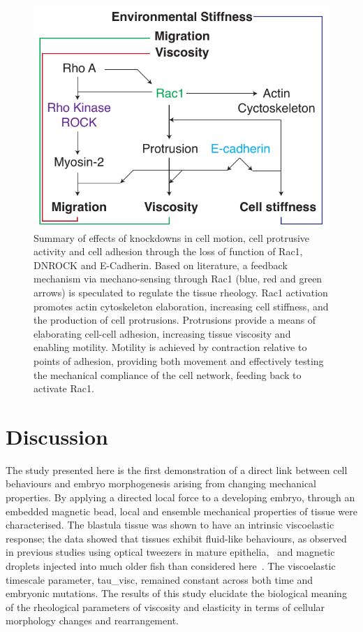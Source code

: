 \begin{figure}
 \centering
 \includegraphics{Chapters/tweezers/Figs/PDF/interconnected_protein_signalling}
 \caption{Summary of effects of knockdowns in cell motion, cell protrusive activity and cell adhesion through the loss of function of \gls{Rac1}, \gls{DNROCK} and E-Cadherin.
 Based on literature, a feedback mechanism via mechano-sensing through \gls{Rac1} (blue, red and green arrows) is speculated to regulate the tissue rheology.
 \gls{Rac1} activation promotes actin cytoskeleton elaboration, increasing cell stiffness, and the production of cell protrusions.
 Protrusions provide a means of elaborating cell-cell adhesion, increasing tissue viscosity and enabling motility.
 Motility is achieved by contraction relative to points of adhesion, providing both movement and effectively testing the mechanical compliance of the cell network, feeding back to activate \gls{Rac1}.
 }
 \label{fig:interconnected_protein_signalling}
\end{figure}

\section{Discussion}

The study presented here is the first demonstration of a direct link between cell behaviours and embryo morphogenesis arising from changing mechanical properties.
By applying a directed local force to a developing embryo, through an embedded magnetic bead, local and ensemble mechanical properties of tissue were characterised.
The blastula tissue was shown to have an intrinsic viscoelastic response;
the data showed that tissues exhibit fluid-like behaviours, as observed in previous studies using optical tweezers in mature epithelia,~\cite{19} and magnetic droplets injected into much older fish than considered here~\cite{18}.
The viscoelastic timescale parameter, \gls{tau_visc}, remained constant across both time and embryonic mutations.
The results of this study elucidate the biological meaning of the rheological parameters of viscosity and elasticity in terms of cellular morphology changes and rearrangement.

